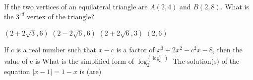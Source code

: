 \documentclass[12pt,addpoints]{exam}
\begin{document}
\begin{questions}
\begin{oneparchoices}
		\end{oneparchoices}
		\question If the two vertices of an equilateral triangle are $A(2,4)$ and $B(2,8)$. What is the $3^{rd}$ vertex of the triangle?\\ \begin{oneparchoices}
			\choice $(2+2\sqrt{3},6)$
			\choice $(2-2\sqrt{6},6)$
			\choice $(2+2\sqrt{6},3)$
			\choice $(2,6)$
		\end{oneparchoices}
		\question If $c$ is a real number such that $x-c$ is a factor of $x^3+2x^2-c^2x-8$, then the value of c is\vspace{0.5in}
		\question What is the simplified form of $\log_2^{(\log^{16}_2)}$\vspace{0.5in}
		\question The solution(s) of the equation $|x-1|=1-x$ is (are)
	\end{questions}	
\end{document}
